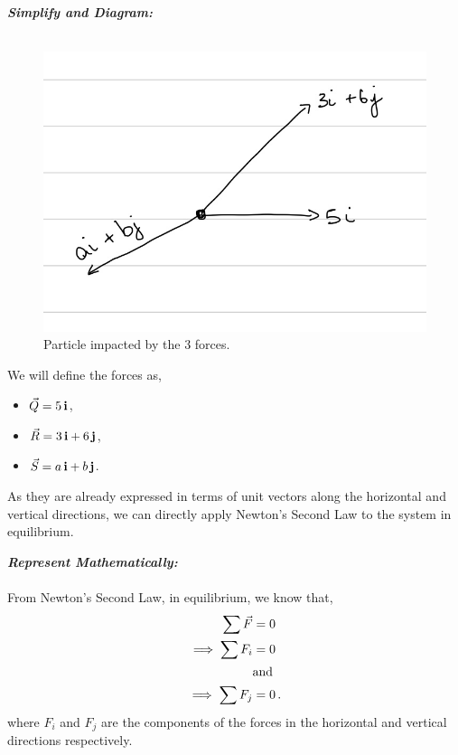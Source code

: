 \begin{subquestions}
\begin{subsubquestions}
\textbf{\textit{Simplify and Diagram:}} \\ \\
\begin{figure}[H]
	\begin{center}
		\includegraphics[scale=0.25]{../2010/figures/2010q6-3}
		\caption{\label{2010:q6:Diagram3} Particle impacted by the 3 forces.}
	\end{center}
\end{figure}
We will define the forces as,
\begin{itemize}
	\item $\vec{Q}=5\,\mathbf{i}$,
	\item $\vec{R}=3\,\mathbf{i}+6\,\mathbf{j}$,
	\item $\vec{S}=a\,\mathbf{i}+b\,\mathbf{j}$.
\end{itemize}
As they are already expressed in terms of unit vectors along the horizontal and vertical directions, we can directly apply Newton's Second Law to the system in equilibrium.




\textbf{\textit{Represent Mathematically:}} \\ \\
From Newton's Second Law, in equilibrium, we know that,
\begin{align}
	\sum \vec{F} & = 0 \nonumber \\
	\implies \sum F_i & = 0 \label{2010:q6:ForceI} \\
	& \text{and} \nonumber \\
	\implies \sum F_j & = 0 \label{2010:q6:ForceJ} \,.
\end{align}
where $F_i$ and $F_j$ are the components of the forces in the horizontal and vertical directions respectively.





\end{subsubquestions}
\end{subquestions}
